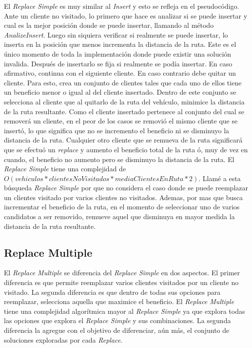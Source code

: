 El \textit{Replace Simple} es muy similar al \textit{Insert} y esto se refleja en el pseudocódigo. Ante un cliente no visitado, lo primero que hace es analizar si se puede insertar y cual es la mejor posición donde se puede insertar, llamando al método \textit{AnalizeInsert}. Luego sin siquiera verificar si realmente se puede insertar, lo inserta en la posición que menos incrementa la distancia de la ruta. Este es el único momento de toda la implementación donde puede existir una solución invalida. Después de insertarlo se fija si realmente se podía insertar. En caso afirmativo, continua con el siguiente cliente. En caso contrario debe quitar un cliente. Para esto, crea un conjunto de clientes tales que cada uno de ellos tiene un beneficio menor o igual al del cliente insertado. Dentro de este conjunto se selecciona al cliente que al quitarlo de la ruta del vehículo, minimice la distancia de la ruta resultante. Como el cliente insertado pertenece al conjunto del cual se removerá un cliente, en el peor de los casos se removió el mismo cliente que se insertó, lo que significa que no se incremento el beneficio ni se disminuyo la distancia de la ruta. Cualquier otro cliente que se remueva de la ruta significará que se efectuó un \textit{replace} y aumento el beneficio total de la ruta ó, muy de vez en cuando, el beneficio no aumento pero se disminuyo la distancia de la ruta. El \textit{Replace Simple} tiene una complejidad de $O(vehiculos * clientesNoVisitados * mediaClientesEnRuta * 2)$. Llamé a esta búsqueda \textit{Replace Simple} por que no considera el caso donde se puede reemplazar un clientes visitado por varios clientes no visitados. Ademas, por mas que busca incrementar el beneficio de la ruta, en el momento de seleccionar uno de varios candidatos a ser removido, remueve aquel que disminuya en mayor medida la distancia de la ruta resultante.

\subsection{Replace Multiple}

El \textit{Replace Multiple} se diferencia del \textit{Replace Simple} en dos aspectos. El primer diferencia es que permite reemplazar varios clientes visitados por un cliente no visitado. La segunda diferencia es que dentro de todas sus opciones para reemplazar, selecciona aquella que maximice el beneficio. El \textit{Replace Multiple} tiene una complejidad algorítmica mayor al \textit{Replace Simple} ya que explora todas las opciones que explora el \textit{Replace Simple} y sus combinaciones. La segunda diferencia la agregue con el objetivo de diferenciar, aún más, el conjunto de soluciones exploradas por cada \textit{Replace}.

